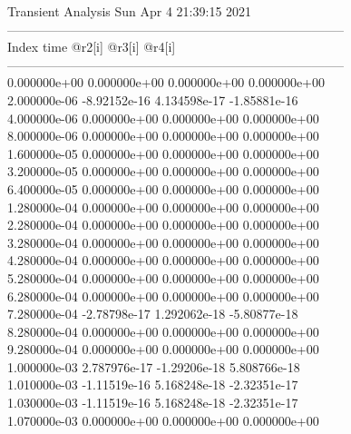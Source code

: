                                    Transient Analysis  Sun Apr  4 21:39:15  2021\\ \hline
--------------------------------------------------------------------------------\\ \hline
Index   time            @r2[i]          @r3[i]          @r4[i]          \\ \hline
--------------------------------------------------------------------------------\\ 	0.000000e+00	0.000000e+00	0.000000e+00	0.000000e+00	\\ 	2.000000e-06	-8.92152e-16	4.134598e-17	-1.85881e-16	\\ 	4.000000e-06	0.000000e+00	0.000000e+00	0.000000e+00	\\ 	8.000000e-06	0.000000e+00	0.000000e+00	0.000000e+00	\\ 	1.600000e-05	0.000000e+00	0.000000e+00	0.000000e+00	\\ 	3.200000e-05	0.000000e+00	0.000000e+00	0.000000e+00	\\ 	6.400000e-05	0.000000e+00	0.000000e+00	0.000000e+00	\\ 	1.280000e-04	0.000000e+00	0.000000e+00	0.000000e+00	\\ 	2.280000e-04	0.000000e+00	0.000000e+00	0.000000e+00	\\ 	3.280000e-04	0.000000e+00	0.000000e+00	0.000000e+00	\\ 	4.280000e-04	0.000000e+00	0.000000e+00	0.000000e+00	\\ 	5.280000e-04	0.000000e+00	0.000000e+00	0.000000e+00	\\ 	6.280000e-04	0.000000e+00	0.000000e+00	0.000000e+00	\\ 	7.280000e-04	-2.78798e-17	1.292062e-18	-5.80877e-18	\\ 	8.280000e-04	0.000000e+00	0.000000e+00	0.000000e+00	\\ 	9.280000e-04	0.000000e+00	0.000000e+00	0.000000e+00	\\ 	1.000000e-03	2.787976e-17	-1.29206e-18	5.808766e-18	\\ 	1.010000e-03	-1.11519e-16	5.168248e-18	-2.32351e-17	\\ 	1.030000e-03	-1.11519e-16	5.168248e-18	-2.32351e-17	\\ 	1.070000e-03	0.000000e+00	0.000000e+00	0.000000e+00	\\ \hline
